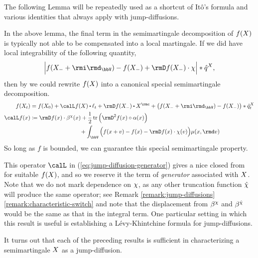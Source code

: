 



The following Lemma will be repeatedly used as a shortcut of It\^o's formula and various identities that always apply with jump-diffusions.



In the above lemma, the final term in the semimartingale decomposition of $f(X)$ is typically not able to be compensated into a local martingale.
If we did have local integrability of the following quantity,
\begin{equation*}
  \Big| f(\X_-+\id_\vecSpace) - f(\X_-) + \Der f(\X_-) \cdot \trunc \Big| \ast \predproj{\jumpMeas^\X},
\end{equation*}
then by \cite[Proposition II.1.28]{jacod2003} we could rewrite $f(X)$ into a canonical special semimartingale decomposition.
\begin{equation}
  \label{eq:jump-diffusion-generator}
  \begin{aligned}
    f(\X_t) &= f(\X_0) + \generator f(\X) \shortInt \leb_t + \Der f(\X_-) \shortInt \X^\rmc + \big( f(\X_- + \id_\vecSpace) - f(\X_-) \big) \ast \compensate{\jumpMeas^\X}_t \\
    \generator f(\stateVar) &\defeq \begin{aligned}[t]
      &\Der f(\stateVar) \cdot \affDrift^\trunc(\stateVar) + \frac12 \tr\Big( \Hess f(\stateVar) \circ \affDiff(\stateVar) \Big) \\
      &\hspace{25mm}+ \int_\vecSpace \Big( f(\stateVar + \markVar) - f(\stateVar) - \Der f(\stateVar) \cdot \trunc(\markVar) \Big) \affJump(\stateVar, \rmd\markVar)
    \end{aligned}
  \end{aligned}
\end{equation}
So long as $f$ is bounded, we can guarantee this special semimartingale property.



This operator $\generator$ in (\ref{eq:jump-diffusion-generator}) gives a nice closed from for suitable $f(X)$, and so we reserve it the term of \emph{generator} associated with $X$.
Note that we do not mark dependence on $\chi$, as any other truncation function $\hat{\chi}$ will produce the same operator; see Remark \ref{remark:jump-diffusions}\ref{remark:characteristic-switch} and note that the displacement from $\beta^\chi$ and $\beta^{\hat{\chi}}$ would be the same as that in the integral term.
One particular setting in which this result is useful is establishing a L\'evy-Khintchine formula for jump-diffusions.



It turns out that each of the preceding results is sufficient in characterizing a semimartingale $X$ as a jump-diffusion.



